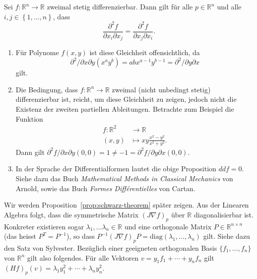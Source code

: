 \documentclass[../main.tex]{subfiles}
\begin{document}
\begin{proposition}\label{prop:schwarz-theorem}
  Sei $f \colon \mathbb{R}^n \to \mathbb{R}$ zweimal stetig differenzierbar.
  Dann gilt für alle $p \in \mathbb{R}^n$
  und alle $i, j \in \left\{1, \dots, n \right\}$, dass
  \[
    \frac{\partial^2 f}{\partial x_i \partial x_j}
    =
    \frac{\partial^2 f}{\partial x_j \partial x_i}.
  \]
\end{proposition}

\begin{remark}
  \leavevmode
  \begin{enumerate}[(1)]
    \item Für Polynome $f(x, y)$ ist diese Gleichheit offensichtlich,
      da
      \[
      \partial^2 / \partial x \partial y (x^a y^b) = ab x^{a-1} y^{b-1}
      = \partial^2 / \partial y \partial x
      \]
      gilt.
    \item
      Die Bedingung, dass $f \colon \mathbb{R}^n \to \mathbb{R}$
      zweimal (nicht unbedingt stetig) differenzierbar ist,
      reicht, um diese Gleichheit zu zeigen, jedoch nicht
      die Existenz der zweiten partiellen Ableitungen.
      Betrachte zum Beispiel die Funktion
      \begin{align*}
        f \colon \mathbb{R}^2 & \to \mathbb{R} \\
        (x, y) & \mapsto xy \frac{x^2 - y^2}{x^2 + y^2}.
      \end{align*}
      Dann gilt $\partial^2 f/ \partial x \partial y (0, 0) = 1
      \neq -1 = \partial^2 f / \partial y \partial x (0, 0)$.
    \item In der Sprache der Differentialformen
      lautet die obige Proposition $ddf = 0$.
      Siehe dazu das Buch \emph{Mathematical Methods in Classical
      Mechanics} von Arnold,
      sowie das Buch \emph{Formes Différentielles} von Cartan.
  \end{enumerate}

\end{remark}

Wir werden Proposition~\ref{prop:schwarz-theorem} später zeigen.
Aus der Linearen Algebra folgt, dass
die symmetrische Matrix ${(J \nabla f)}_p$ über $\mathbb{R}$
diagonalisierbar ist.
Konkreter existieren sogar
$\lambda_1, \dots \lambda_n \in \mathbb{R}$ und
eine orthogonale Matrix $P \in \mathbb{R}^{n \times n}$
(das heisst $P^T = P^{-1}$), so dass
$P^{-1} {(J \nabla f)}_p P = \text{diag}(\lambda_1, \dots, \lambda_n)$
gilt. Siehe dazu den Satz von Sylvester.
Bezüglich einer geeigneten orthogonalen Basis
$\{f_1, \dots, f_n \}$ von $\mathbb{R}^n$
gilt also folgendes. Für alle
Vektoren
$v = y_1 f_1 + \cdots + y_n f_n$ gilt
${(Hf)}_p(v) = \lambda_1 y_1^2 + \cdots + \lambda_n y_n^2$.
\end{document}

